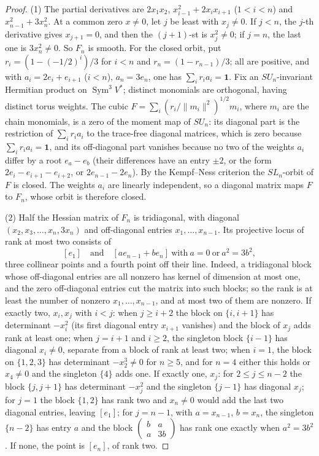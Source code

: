 \documentclass[11pt,a4paper]{article}
\theoremstyle{definition}
\newcommand{\one}{\mathbf{1}}
\newcommand{\Sym}{\operatorname{Sym}}
\begin{document}
\begin{proof}
(1) The partial derivatives are $2x_1x_2$, $x_{i-1}^2+2x_ix_{i+1}$
($1<i<n$) and $x_{n-1}^2+3x_n^2$. At a common zero $x\ne0$, let $j$ be least
with $x_j\ne0$. If $j<n$, the $j$-th derivative gives $x_{j+1}=0$, and then
the $(j+1)$-st is $x_j^2\ne0$; if $j=n$, the last one is $3x_n^2\ne0$. So
$F_n$ is smooth. For the closed orbit, put $r_i=(1-(-1/2)^i)/3$ for $i<n$ and
$r_n=(1-r_{n-1})/3$; all are positive, and with $a_i=2e_i+e_{i+1}$ ($i<n$),
$a_n=3e_n$, one has $\sum_ir_ia_i=\one$. Fix an $SU_n$-invariant Hermitian
product on $\Sym^3V^*$; distinct monomials are orthogonal, having distinct
torus weights. The cubic $F=\sum_i(r_i/\|m_i\|^2)^{1/2}m_i$, where $m_i$ are the
chain monomials, is a zero of the moment map of $SU_n$: its diagonal part is the restriction of $\sum_ir_ia_i$ to the trace-free
diagonal matrices, which is zero because $\sum_ir_ia_i=\one$, and its off-diagonal part
vanishes because no two of the weights $a_i$ differ by a root $e_a-e_b$
(their differences have an entry $\pm2$, or the form $2e_i-e_{i+1}-e_{i+2}$, or
$2e_{n-1}-2e_n$). By the Kempf--Ness criterion \cite[Theorem 4, p.~1]{Losev}
the $SL_n$-orbit of $F$ is closed. The weights $a_i$ are linearly independent,
so a diagonal matrix maps $F$ to $F_n$, whose orbit is therefore closed.

(2) Half the Hessian matrix of $F_n$ is tridiagonal, with diagonal
$(x_2,x_3,\dots,x_n,3x_n)$ and off-diagonal entries $x_1,\dots,x_{n-1}$. Its
projective locus of rank at most two consists of
\begin{equation}\label{eq:hessianlocus}
 [e_1]\quad\text{and}\quad[ae_{n-1}+be_n]\ \text{with}\ a=0\ \text{or}\ a^2=3b^2 ,
\end{equation}
three collinear points and a fourth point off their line. Indeed, a tridiagonal
block whose off-diagonal entries are all nonzero has kernel of dimension at
most one, and the zero off-diagonal entries cut the matrix into such blocks; so
the rank is at least the number of nonzero $x_1,\dots,x_{n-1}$, and at most two
of them are nonzero. If exactly two, $x_i,x_j$ with $i<j$: when $j\ge i+2$ the
block on $\{i,i+1\}$ has determinant $-x_i^2$ (its first diagonal entry
$x_{i+1}$ vanishes) and the block of $x_j$ adds rank at least one; when $j=i+1$
and $i\ge2$, the singleton block $\{i-1\}$ has diagonal $x_i\ne0$, separate
from a block of rank at least two; when $i=1$, the block on $\{1,2,3\}$ has
determinant $-x_2^3\ne0$ for $n\ge5$, and for $n=4$ either this holds or
$x_4\ne0$ and the singleton $\{4\}$ adds one. If exactly one, $x_j$: for $2\le
j\le n-2$ the block $\{j,j+1\}$ has determinant $-x_j^2$ and the singleton
$\{j-1\}$ has diagonal $x_j$; for $j=1$ the block $\{1,2\}$ has rank two and
$x_n\ne0$ would add the last two diagonal entries, leaving $[e_1]$; for
$j=n-1$, with $a=x_{n-1}$, $b=x_n$, the singleton $\{n-2\}$ has entry $a$ and
the block $\left(\begin{smallmatrix}b&a\\a&3b\end{smallmatrix}\right)$ has rank
one exactly when $a^2=3b^2$. If none, the point is $[e_n]$, of rank two.


\end{proof}
\end{document}

